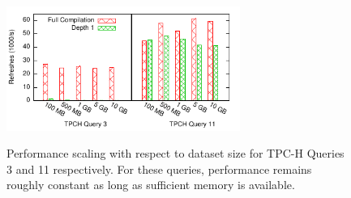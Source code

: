 \begin{figure}
\begin{center}
\includegraphics[width=3in]{../graphs/graphs/scaling.pdf} \\
\caption{Performance scaling with respect to dataset size for TPC-H Queries 3 and 11 respectively.  For these queries, performance remains roughly constant as long as sufficient memory is available.}
\label{fig:experiments:big}

\end{center}\vspace*{-0.2in}
\end{figure}



